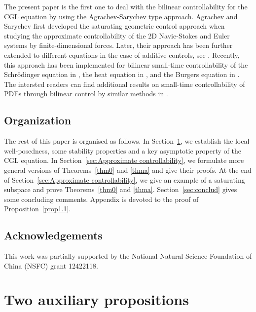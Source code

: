 \documentclass[review]{elsarticle}
\theoremstyle{dotless}
\numberwithin{equation}{section}
\begin{document}
The present paper is the first one to deal with the bilinear controllability for the CGL equation by using the Agrachev-Sarychev type approach. Agrachev and Sarychev \cite{AS05,AS06,AS08} first developed the saturating geometric control approach when studying the approximate controllability of the 2D Navie-Stokes  and Euler systems by finite-dimensional forces. Later, their approach has been further extended to different equations in the case of additive controls, see \cite{Nersesyan21,CPAM2025,JMPA2024,Sarychev12,Shirikyan06,Shirikyan18}. Recently, this approach has been implemented for bilinear small-time  controllability of the Schr\"odinger equation in \cite{KB_EP_2,Duca_EMS},  the heat equation in \cite{Duca_JMPA}, and the Burgers equation in \cite{Duca_Burgers}. The intersted readers can find additional results on small-time controllability of PDEs through bilinear control by similar methods in \cite{CP_Auto,CoronXZ_JDE,DucaNersesyan_SICON,Duca_SICON,Pozzoli_JDE}.

\subsection{Organization}
The rest of this paper is organised as follows. In Section~\ref{sec:Preliminaries}, we establish the local well-posedness, some stability properties and a key asymptotic property  of the CGL equation. In Section~\ref{sec:Approximate controllability}, we formulate more general versions of Theorems~\ref{thm0} and \ref{thma}  and give their proofs. At the end of Section~\ref{sec:Approximate controllability}, we give an example of a saturating subspace and prove Theorems~\ref{thm0} and \ref{thma}. Section~\ref{sec:conclud} gives some concluding comments. Appendix is devoted to the proof of Proposition~\ref{prop1.1}.

\subsection{Acknowledgements}
This work was partially supported  by the National Natural Science Foundation of China (NSFC) grant 12422118.


\section{Two auxiliary propositions}\label{sec:Preliminaries}
\end{document}
